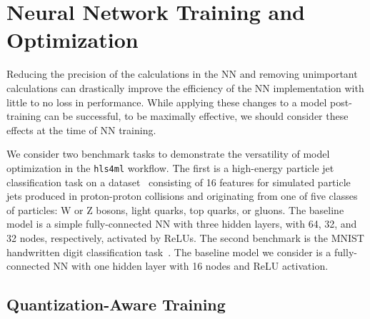 \documentclass[tinyml]{acmart}
\newcommand{\hlsfml}{\texttt{hls4ml}\xspace}
\begin{document}

\section{Neural Network Training and Optimization}
\label{sec:nnto}


Reducing the precision of the calculations in the NN and removing unimportant calculations can drastically improve the efficiency of the NN implementation with little to no loss in performance.
While applying these changes to a model post-training can be successful, to be maximally effective, we should consider these effects at the time of NN training.

We consider two benchmark tasks to demonstrate the versatility of model optimization in the \hlsfml workflow.
The first is a high-energy particle jet classification task on a dataset~\cite{hls4mldata_150p,Coleman:2017fiq,Duarte:2018ite} consisting of 16 features for simulated particle jets produced in proton-proton collisions and originating from one of five classes of particles: W or Z bosons, light quarks, top quarks, or gluons.
The baseline model is a simple fully-connected NN with three hidden layers, with 64, 32, and 32 nodes, respectively, activated by ReLUs.
The second benchmark is the MNIST handwritten digit classification task~\cite{MNIST}.
The baseline model we consider is a fully-connected NN with one hidden layer with 16 nodes and ReLU activation.

\subsection{Quantization-Aware Training}
\label{sec:qat}
\end{document}
